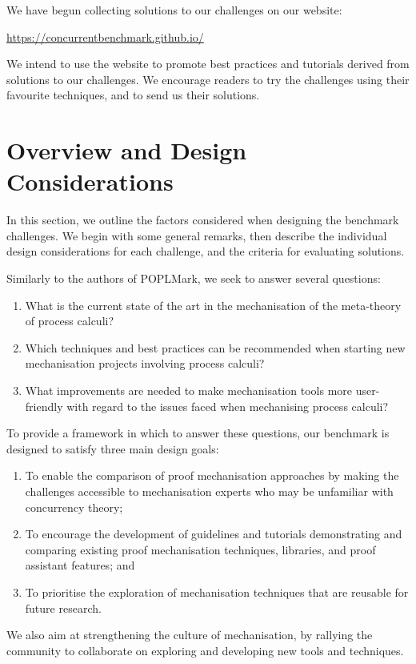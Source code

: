 \documentclass[runningheads]{llncs}
\begin{document}
We have begun collecting solutions to our challenges on our website:
\begin{center}
  \url{https://concurrentbenchmark.github.io/}
\end{center}
We intend to use the website to promote best practices and tutorials derived from solutions to our challenges.
We encourage readers to try the challenges using their favourite techniques, and to send us their solutions.

\section{Overview and Design Considerations}\label{sec:design-discussion}
In this section, we outline the factors considered when designing the benchmark challenges.
We begin with some general remarks, then describe the individual design considerations for each challenge, and the criteria for evaluating solutions.

Similarly to the authors of POPLMark, we seek to answer several questions:
\begin{enumerate}[label=\textbf{(Q\arabic*)},leftmargin=10mm]
\item\label{item:rq1} What is the current state of the art in the mechanisation of  the meta-theory of process calculi?
\item\label{item:rq2} Which techniques and best practices can be recommended when starting new mechanisation projects involving process calculi?
\item\label{item:rq3} What improvements are needed to make mechanisation tools more user-friendly with regard to the issues faced when mechanising process calculi?
\end{enumerate}

To provide a framework in which to answer these questions, our benchmark is designed to satisfy three main design goals:
\begin{enumerate}[label=\textbf{(G\arabic*)},leftmargin=10mm]
\item\label{item:goal-comperison-accessibility} To enable the comparison of
  proof mechanisation approaches by making the challenges accessible to
  mechanisation experts who may be unfamiliar with concurrency theory;

\item\label{item:goal-tutorials} To encourage the development of guidelines and
  tutorials demonstrating and comparing existing proof mechanisation
  techniques, libraries, and proof assistant features; and

\item\label{item:goal-reusability} To prioritise the exploration of mechanisation
  techniques that are reusable for future research.
\end{enumerate}
We also aim at strengthening the culture of mechanisation, by rallying the community to collaborate on exploring and developing new tools and techniques.
\end{document}
